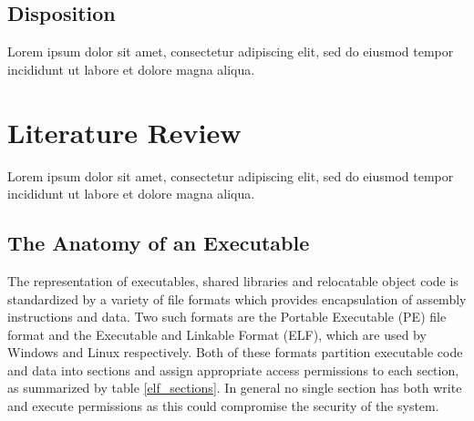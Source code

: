 \documentclass[12pt, a4paper]{article}
\begin{document}
%
%


\subsection{Disposition}

Lorem ipsum dolor sit amet, consectetur adipiscing elit, sed do eiusmod tempor incididunt ut labore et dolore magna aliqua.



\section{Literature Review}

Lorem ipsum dolor sit amet, consectetur adipiscing elit, sed do eiusmod tempor incididunt ut labore et dolore magna aliqua.


\subsection{The Anatomy of an Executable}

The representation of executables, shared libraries and relocatable object code is standardized by a variety of file formats which provides encapsulation of assembly instructions and data. Two such formats are the Portable Executable (PE) file format and the Executable and Linkable Format (ELF), which are used by Windows and Linux respectively. Both of these formats partition executable code and data into sections and assign appropriate access permissions to each section, as summarized by table \ref{elf_sections}. In general no single section has both write and execute permissions as this could compromise the security of the system.
\end{document}
